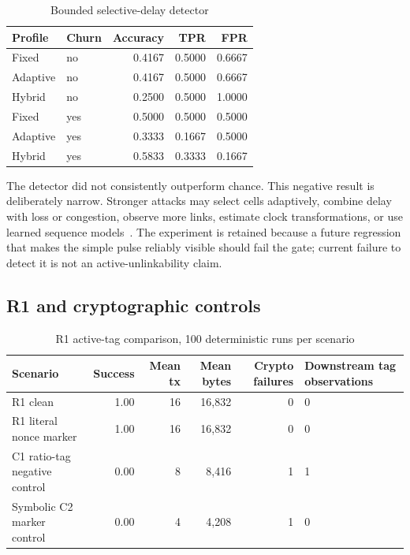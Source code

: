 \documentclass[11pt,oneside]{article}
\begin{document}
\begin{table}[ht]
\centering
\caption{Bounded selective-delay detector}
\label{tab:t4delay}
\begin{tabular}{@{}llrrr@{}}
\toprule
Profile & Churn & Accuracy & TPR & FPR \\
\midrule
Fixed & no & 0.4167 & 0.5000 & 0.6667 \\
Adaptive & no & 0.4167 & 0.5000 & 0.6667 \\
Hybrid & no & 0.2500 & 0.5000 & 1.0000 \\
Fixed & yes & 0.5000 & 0.5000 & 0.5000 \\
Adaptive & yes & 0.3333 & 0.1667 & 0.5000 \\
Hybrid & yes & 0.5833 & 0.3333 & 0.1667 \\
\bottomrule
\end{tabular}
\end{table}

The detector did not consistently outperform chance. This negative result is deliberately narrow. Stronger attacks may select cells adaptively, combine delay with loss or congestion, observe more links, estimate clock transformations, or use learned sequence models~\cite{dropmark,duster,deepcorr,activeflowmark2026}. The experiment is retained because a future regression that makes the simple pulse reliably visible should fail the gate; current failure to detect it is not an active-unlinkability claim.


\subsection{R1 and cryptographic controls}

\begin{table}[ht]
\centering
\caption{R1 active-tag comparison, 100 deterministic runs per scenario}
\label{tab:r1results}
\begin{tabularx}{\textwidth}{@{}p{}rrrrX@{}}
\toprule
Scenario & Success & Mean tx & Mean bytes & Crypto failures & Downstream tag observations \\
\midrule
R1 clean & 1.00 & 16 & 16,832 & 0 & 0 \\
R1 literal nonce marker & 1.00 & 16 & 16,832 & 0 & 0 \\
C1 ratio-tag negative control & 0.00 & 8 & 8,416 & 1 & 1 \\
Symbolic C2 marker control & 0.00 & 4 & 4,208 & 1 & 0 \\
\bottomrule
\end{tabularx}
\end{table}
\end{document}
